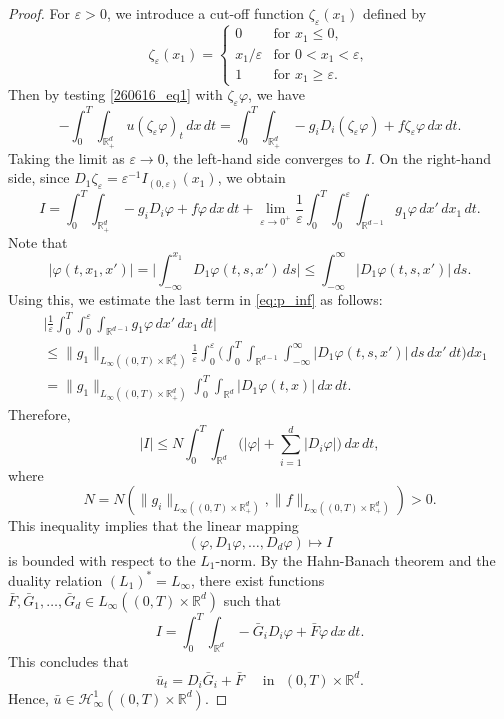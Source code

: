 \documentclass[10pt,a4paper]{amsart}
\def\bR{\mathbb{R}}
\def\cH{\mathcal{H}}
\begin{document}
\begin{proof}
For $\varepsilon > 0$, we introduce a cut-off function $\zeta_\varepsilon(x_1)$ defined by
\[
\zeta_\varepsilon(x_1) = 
\begin{cases}
    0 & \text{for } x_1 \le 0, \\[4pt]
    x_1/\varepsilon & \text{for } 0 < x_1 < \varepsilon, \\[4pt]
    1 & \text{for } x_1 \ge \varepsilon.
\end{cases}
\]
Then by testing \eqref{260616_eq1} with $\zeta_{\varepsilon}\varphi$, we have
$$
-\int_0^T \int_{\bR^d_+} u (\zeta_\varepsilon \varphi)_t \,dx\,dt = \int_0^T \int_{\bR^d_+} - g_i D_i(\zeta_\varepsilon \varphi) + f \zeta_\varepsilon \varphi  \,dx\,dt.
$$
Taking the limit as $\varepsilon \to 0$, the left-hand side converges to $I$. 
On the right-hand side, since $D_1 \zeta_\varepsilon = \varepsilon^{-1} I_{(0, \varepsilon)}(x_1)$, we obtain
\begin{equation}
    \label{eq:p_inf}
I = \int_0^T \int_{\bR^d_+} - g_i D_i \varphi + f \varphi  \,dx\,dt + \lim_{\varepsilon \to 0^+} \frac{1}{\varepsilon} \int_0^T \int_0^\varepsilon \int_{\bR^{d-1}} g_1 \varphi \,dx'\,dx_1\,dt.
\end{equation}
Note that
$$
|\varphi(t, x_1, x')| = \bigg| \int_{-\infty}^{x_1} D_1 \varphi(t, s, x') \,ds \bigg| \le \int_{-\infty}^\infty |D_1 \varphi(t, s, x')| \,ds.
$$
Using this, we estimate the last term in \eqref{eq:p_inf} as follows:
$$
\begin{aligned}
&\bigg| \frac{1}{\varepsilon} \int_0^T \int_0^\varepsilon \int_{\bR^{d-1}} g_1 \varphi \,dx'\,dx_1\,dt \bigg| \\
&\le \|g_1\|_{L_\infty((0,T)\times \bR^d_+)} \frac{1}{\varepsilon} \int_0^\varepsilon \bigg( \int_0^T \int_{\bR^{d-1}} \int_{-\infty}^\infty |D_1 \varphi(t,s, x')| \,ds \,dx'\,dt \bigg) dx_1 \\
&= \|g_1\|_{L_\infty((0,T)\times \bR^d_+)} \int_0^T \int_{\bR^d} |D_1 \varphi(t, x)| \,dx\,dt.
\end{aligned}
$$
Therefore, 
$$
|I| \le N \int_0^T \int_{\bR^d} \bigg( |\varphi| + \sum_{i=1}^d |D_i \varphi| \bigg) \,dx\,dt,
$$
where
\[
N=N\left(\|g_i\|_{L_\infty((0,T)\times \bR^d_+)}, \|f\|_{L_\infty((0,T)\times \bR^d_+)}\right) > 0.
\]
This inequality implies that the linear mapping
\[
(\varphi, D_1 \varphi, \dots, D_d \varphi) \mapsto I
\]
is bounded with respect to the $L_1$-norm.
By the Hahn-Banach theorem and the duality relation $(L_1)^* = L_\infty$, there exist functions $\bar{F}, \bar{G}_1, \dots, \bar{G}_d \in L_\infty((0,T)\times \bR^d)$ such that
$$
I = \int_0^T \int_{\bR^d} -\bar{G}_i D_i \varphi +  \bar{F} \varphi \,dx\,dt.
$$
This concludes that
\[
\bar{u}_t = D_i \bar{G}_i + \bar{F} \quad \textrm{ in }\,\, (0,T)\times \bR^d.
\]
Hence, $\bar{u} \in \cH^1_\infty((0,T)\times \bR^d)$.
\end{proof}
\end{document}
